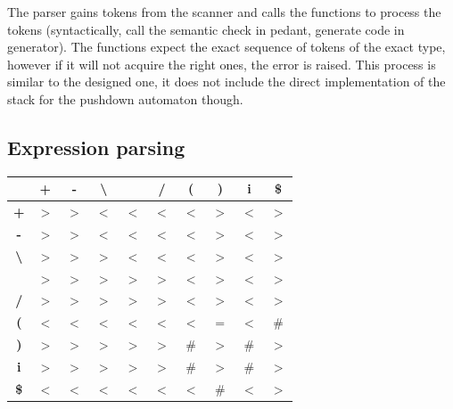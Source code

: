 \documentclass[10pt,a4paper,titlepage]{article}
\begin{document}
\begin{justify}
The parser gains tokens from the scanner and calls the functions to process
the tokens (syntactically, call the semantic check in pedant, generate code
in generator). The functions expect the exact sequence of tokens of the exact
type, however if it will not acquire the right ones, the error is raised. This
process is similar to the designed one, it does not include the direct
implementation of the stack for the pushdown automaton though.
\end{justify}

\subsection {Expression parsing}
{\scriptsize
  \begin{center}
    \begin{tabular}{ | c | c c c c c c c c c | } \hline
                             & \textbf + & \textbf - &\textbf \textbackslash & \textbf * & \textbf / & \textbf ( & \textbf ) & \textbf i & \textbf \$  \\ \hline
      \textbf +              & $>$       & $>$       & $<$                   & $<$       & $<$       & $<$       & $>$       & $<$       & $>$         \\
      \textbf -              & $>$       & $>$       & $<$                   & $<$       & $<$       & $<$       & $>$       & $<$       & $>$         \\
      \textbf \textbackslash & $>$       & $>$       & $>$                   & $<$       & $<$       & $<$       & $>$       & $<$       & $>$         \\
      \textbf *              & $>$       & $>$       & $>$                   & $>$       & $>$       & $<$       & $>$       & $<$       & $>$         \\
      \textbf /              & $>$       & $>$       & $>$                   & $>$       & $>$       & $<$       & $>$       & $<$       & $>$         \\
      \textbf (              & $<$       & $<$       & $<$                   & $<$       & $<$       & $<$       & =         & $<$       & \#          \\
      \textbf )              & $>$       & $>$       & $>$                   & $>$       & $>$       & \#        & $>$       & \#        & $>$         \\
      \textbf i              & $>$       & $>$       & $>$                   & $>$       & $>$       & \#        & $>$       & \#        & $>$         \\
      \textbf \$             & $<$       & $<$       & $<$                   & $<$       & $<$       & $<$       & \#        & $<$       & $>$         \\ \hline
    \end{tabular}
  \end{center}
}
\end{document}
